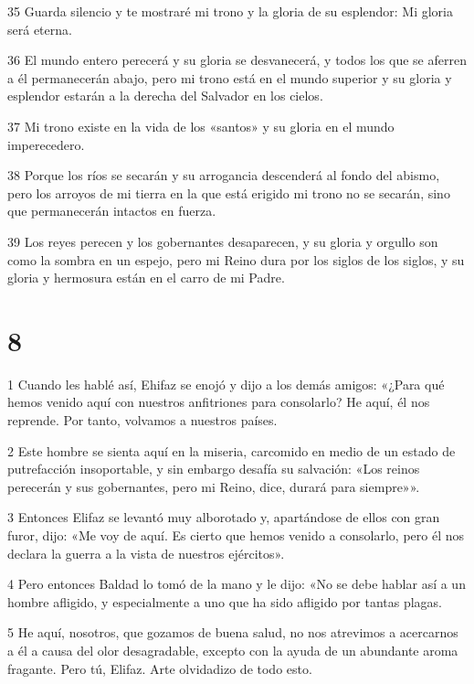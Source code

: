\par 35 Guarda silencio y te mostraré mi trono y la gloria de su esplendor: Mi gloria será eterna.

\par 36 El mundo entero perecerá y su gloria se desvanecerá, y todos los que se aferren a él permanecerán abajo, pero mi trono está en el mundo superior y su gloria y esplendor estarán a la derecha del Salvador en los cielos.

\par 37 Mi trono existe en la vida de los «santos» y su gloria en el mundo imperecedero.

\par 38 Porque los ríos se secarán y su arrogancia descenderá al fondo del abismo, pero los arroyos de mi tierra en la que está erigido mi trono no se secarán, sino que permanecerán intactos en fuerza.

\par 39 Los reyes perecen y los gobernantes desaparecen, y su gloria y orgullo son como la sombra en un espejo, pero mi Reino dura por los siglos de los siglos, y su gloria y hermosura están en el carro de mi Padre.

\chapter{8}

\par 1 Cuando les hablé así, Ehifaz se enojó y dijo a los demás amigos: «¿Para qué hemos venido aquí con nuestros anfitriones para consolarlo? He aquí, él nos reprende. Por tanto, volvamos a nuestros países.

\par 2 Este hombre se sienta aquí en la miseria, carcomido en medio de un estado de putrefacción insoportable, y sin embargo desafía su salvación: «Los reinos perecerán y sus gobernantes, pero mi Reino, dice, durará para siempre»».

\par 3 Entonces Elifaz se levantó muy alborotado y, apartándose de ellos con gran furor, dijo: «Me voy de aquí. Es cierto que hemos venido a consolarlo, pero él nos declara la guerra a la vista de nuestros ejércitos».

\par 4 Pero entonces Baldad lo tomó de la mano y le dijo: «No se debe hablar así a un hombre afligido, y especialmente a uno que ha sido afligido por tantas plagas.

\par 5 He aquí, nosotros, que gozamos de buena salud, no nos atrevimos a acercarnos a él a causa del olor desagradable, excepto con la ayuda de un abundante aroma fragante. Pero tú, Elifaz. Arte olvidadizo de todo esto.


